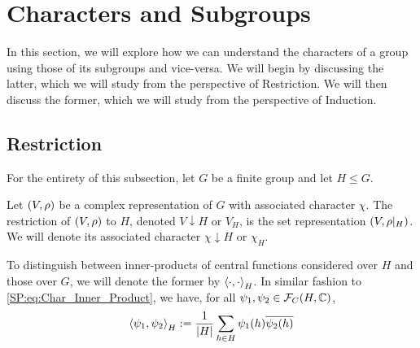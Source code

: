 \section{Characters and Subgroups}

In this section, we will explore how we can understand the characters of a group using those of its subgroups and vice-versa. We will begin by discussing the latter, which we will study from the perspective of Restriction. We will then discuss the former, which we will study from the perspective of Induction.

\subsection{Restriction}

For the entirety of this subsection, let $G$ be a finite group and let $H \leq G$. %

\begin{boxdefinition}
    Let $\left( V, \rho \right)$ be a complex representation of $G$ with associated character $\chi$. The restriction of $\left( V, \rho \right)$ to $H$, denoted $V \downarrow H$ or $V_H$, is the set representation $\left( V, \rho\vert_H \right)$. We will denote its associated character $\chi \downarrow H$ or $\chi_H$.
\end{boxdefinition}

\begin{boxnotation}
    To distinguish between inner-products of central functions considered over $H$ and those over $G$, we will denote the former by $\left\langle \cdot, \cdot \right\rangle_H$. In similar fashion to \eqref{SP:eq:Char_Inner_Product}, we have, for all $\psi_1, \psi_2 \in \mathcal{F}_C\!\left( H, \mathbb{C} \right)$,
    \begin{align}
        \left\langle \psi_1, \psi_2 \right\rangle_H := \frac{1}{\left\lvert H \right\rvert} \sum_{h \in H} \psi_1(h) \overline{\psi_2(h)}
    \end{align}
\end{boxnotation}

